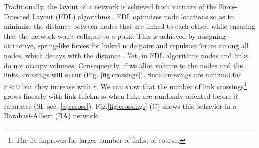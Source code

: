 \documentclass[nofootinbib,preprint,floatfix,endfloats]{revtex4} %
\begin{document}
Traditionally, the layout of a network is achieved from variants of the Force-Directed Layout (FDL) algorithms \cite{kamada1989algorithm,davidson1996drawing,fruchterman1991graph,barnes1986hierarchical}. 
FDL optimizes node locations so as to minimize the distance between nodes that are linked to each other, while ensuring that the network won't collapse to a point. 
This is achieved by assigning attractive, spring-like forces for linked node pairs and repulsive forces among all nodes, which decays with the distance %
 \cite{kabourov2015spring}.
Yet, in FDL algorithms nodes and links do not occupy volumes. Consequently, if we allot volume to the nodes and the links, crossings will occur (Fig. \ref{fig:crossings}). Such crossings are minimal for $r\approx 0$ but they increase with $r$.
We can show that the number of link crossings\footnote{
The fit improves for larger number of links, of course.} grows linearly with link thickness when links are randomly oriented before it saturates (SI, sec. \ref{ap:cross}). 
Fig.\ref{fig:crossings} (C) shows this behavior in a Barabasi-Albert (BA) network.%
%
\end{document}
